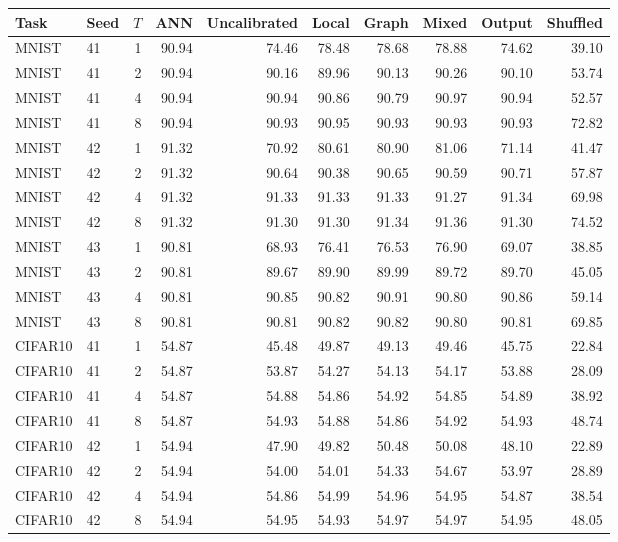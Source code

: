 \begin{table}[p]\centering\footnotesize
\begin{tabular}{llrrrrrrrr}\toprule
Task & Seed & $T$ & ANN & Uncalibrated & Local & Graph & Mixed & Output & Shuffled \\ \midrule
MNIST & 41 & 1 & 90.94 & 74.46 & 78.48 & 78.68 & 78.88 & 74.62 & 39.10 \\
MNIST & 41 & 2 & 90.94 & 90.16 & 89.96 & 90.13 & 90.26 & 90.10 & 53.74 \\
MNIST & 41 & 4 & 90.94 & 90.94 & 90.86 & 90.79 & 90.97 & 90.94 & 52.57 \\
MNIST & 41 & 8 & 90.94 & 90.93 & 90.95 & 90.93 & 90.93 & 90.93 & 72.82 \\
\addlinespace[2pt]
MNIST & 42 & 1 & 91.32 & 70.92 & 80.61 & 80.90 & 81.06 & 71.14 & 41.47 \\
MNIST & 42 & 2 & 91.32 & 90.64 & 90.38 & 90.65 & 90.59 & 90.71 & 57.87 \\
MNIST & 42 & 4 & 91.32 & 91.33 & 91.33 & 91.33 & 91.27 & 91.34 & 69.98 \\
MNIST & 42 & 8 & 91.32 & 91.30 & 91.30 & 91.34 & 91.36 & 91.30 & 74.52 \\
\addlinespace[2pt]
MNIST & 43 & 1 & 90.81 & 68.93 & 76.41 & 76.53 & 76.90 & 69.07 & 38.85 \\
MNIST & 43 & 2 & 90.81 & 89.67 & 89.90 & 89.99 & 89.72 & 89.70 & 45.05 \\
MNIST & 43 & 4 & 90.81 & 90.85 & 90.82 & 90.91 & 90.80 & 90.86 & 59.14 \\
MNIST & 43 & 8 & 90.81 & 90.81 & 90.82 & 90.82 & 90.80 & 90.81 & 69.85 \\
\addlinespace[2pt]
CIFAR10 & 41 & 1 & 54.87 & 45.48 & 49.87 & 49.13 & 49.46 & 45.75 & 22.84 \\
CIFAR10 & 41 & 2 & 54.87 & 53.87 & 54.27 & 54.13 & 54.17 & 53.88 & 28.09 \\
CIFAR10 & 41 & 4 & 54.87 & 54.88 & 54.86 & 54.92 & 54.85 & 54.89 & 38.92 \\
CIFAR10 & 41 & 8 & 54.87 & 54.93 & 54.88 & 54.86 & 54.92 & 54.93 & 48.74 \\
\addlinespace[2pt]
CIFAR10 & 42 & 1 & 54.94 & 47.90 & 49.82 & 50.48 & 50.08 & 48.10 & 22.89 \\
CIFAR10 & 42 & 2 & 54.94 & 54.00 & 54.01 & 54.33 & 54.67 & 53.97 & 28.89 \\
CIFAR10 & 42 & 4 & 54.94 & 54.86 & 54.99 & 54.96 & 54.95 & 54.87 & 38.54 \\
CIFAR10 & 42 & 8 & 54.94 & 54.95 & 54.93 & 54.97 & 54.97 & 54.95 & 48.05 \\

\end{tabular}
\end{table}
